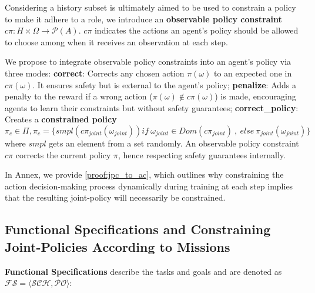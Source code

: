 \documentclass[sigconf,anonymous]{aamas}
\begin{document}
Considering a history subset is ultimately aimed to be used to constrain a policy to make it adhere to a role, we introduce an \textbf{observable policy constraint} $c\pi: H \times \Omega \rightarrow \mathcal{P}(A)$. $c\pi$ indicates the actions an agent's policy should be allowed to choose among when it receives an observation at each step.

%     

We propose to integrate observable policy constraints into an agent's policy via three modes:
\textbf{correct}: Corrects any chosen action $\pi(\omega)$ to an expected one in $c\pi(\omega)$. It ensures safety but is external to the agent's policy; \quad
\textbf{penalize}: Adds a penalty to the reward if a wrong action ($\pi(\omega) \notin c\pi(\omega)$) is made, encouraging agents to learn their constraints but without safety guarantees; \quad
\textbf{correct\_policy}: Creates a \textbf{constrained policy} $\pi_c \in \Pi, \pi_c = \{smpl(c\pi_{joint}(\omega_{joint})) \allowbreak if \ \omega_{joint} \in Dom(c\pi_{joint}) \ \allowbreak, \ \allowbreak else \ \allowbreak \pi_{joint}(\omega_{joint})\}$ where $smpl$ gets an element from a set randomly. An observable policy constraint $c\pi$ corrects the current policy $\pi$, hence respecting safety guarantees internally.

In Annex, we provide \autoref{proof:jpc_to_ac}, which outlines why constraining the action decision-making process dynamically during training at each step implies that the resulting joint-policy will necessarily be constrained.


\subsection{Functional Specifications and Constraining Joint-Policies According to Missions}

\textbf{Functional Specifications} describe the tasks and goals and are denoted as $\mathcal{FS} = \langle \mathcal{SCH}, \mathcal{PO} \rangle$:
\end{document}
